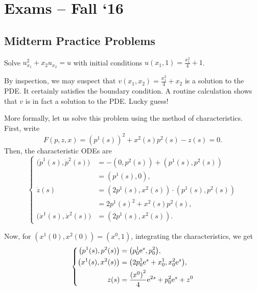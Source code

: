 \section{Exams -- Fall `16}
\subsection{Midterm Practice Problems}
\begin{problem}
  Solve \(u_{x_1}^2+x_2u_{x_2}=u\) with initial conditions
  \(u(x_1,1)=\frac{x_1^2}{4}+1\).
\end{problem}
\begin{solution*}
  By inspection, we may suspect that \(v(x_1,x_2)=\frac{x_1^2}{4}+x_2\) is
  a solution to the PDE. It certainly satisfies the boundary condition. A
  routine calculation shows that \(v\) is in fact a solution to the
  PDE. Lucky guess!

  More formally, let us solve this problem using the method of
  characteristics. First, write
  \[
    F(p,z,x)={(p^1(s))}^2+x^2(s)p^2(s)-z(s)=0.
  \]
  Then, the characteristic ODEs are
  \[
    \left\{
      \begin{aligned}
        \bigl(\dot p^1(s),\dot p^2(s)\bigr)
        &=-(0,p^2(s))+(p^1(s),p^2(s))\\
        &=(p^1(s),0),\\
        \dot z(s)
        &=(2p^1(s),x^2(s))\cdot (p^1(s),p^2(s))\\
        &=2p^1(s)^2+x^2(s)p^2(s),\\
        \bigl(\dot x^1(s),\dot x^2(s)\bigr)&=(2p^1(s),x^2(s)).
      \end{aligned}
    \right.
  \]

  Now, for \((x^1(0),x^2(0))=(x^0,1)\), integrating the characteristics, we
  get
  \[
    \left\{
      \begin{aligned}
        \bigl(p^1(s),p^2(s)\bigr)&=\bigl(p_0^1\mathrm{e}^s,p^2_0\bigr),\\
        \bigl(x^1(s),x^2(s)\bigr)
        &=\bigl(2p_0^1\mathrm{e}^s+x_0^1,x_0^2\mathrm{e}^s\bigr),\\
        z(s)&=\frac{{(x^0)}^2}{4}\mathrm{e}^{2s}+p_0^2\mathrm{e}^s+z^0
      \end{aligned}
    \right.
  \]


\end{solution*}
